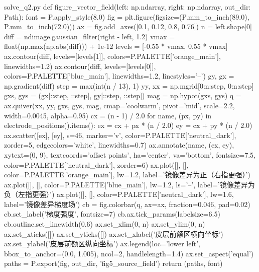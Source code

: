 \documentclass[bwprint]{gmcmthesis}
\begin{document}
\begin{appendices}
\begin{Python}{solve\_q2.py}
def figure_vector_field(left: np.ndarray, right: np.ndarray, out_dir: Path):
    font = P.apply_style(8.0)
    fig = plt.figure(figsize=(P.mm_to_inch(89.0), P.mm_to_inch(72.0)))
    ax = fig.add_axes([0.1, 0.12, 0.8, 0.76])
    n = left.shape[0]
    diff = ndimage.gaussian_filter(right - left, 1.2)
    vmax = float(np.max(np.abs(diff))) + 1e-12
    levels = [-0.55 * vmax, 0.55 * vmax]
    ax.contour(diff, levels=[levels[1]], colors=P.PALETTE['orange_main'], linewidths=1.2)
    ax.contour(diff, levels=[levels[0]], colors=P.PALETTE['blue_main'], linewidths=1.2, linestyles='--')
    gy, gx = np.gradient(diff)
    step = max(int(n / 13), 1)
    yy, xx = np.mgrid[0:n:step, 0:n:step]
    gxs, gys = (gx[::step, ::step], gy[::step, ::step])
    mag = np.hypot(gxs, gys)
    q = ax.quiver(xx, yy, gxs, gys, mag, cmap='coolwarm', pivot='mid', scale=2.2, width=0.0045, alpha=0.95)
    cx = (n - 1) / 2.0
    for name, (px, py) in electrode_positions().items():
        ex = cx + px * (n / 2.0)
        ey = cx + py * (n / 2.0)
        ax.scatter([ex], [ey], s=46, marker='v', color=P.PALETTE['neutral_dark'], zorder=5, edgecolors='white', linewidths=0.7)
        ax.annotate(name, (ex, ey), xytext=(0, 9), textcoords='offset points', ha='center', va='bottom', fontsize=7.5, color=P.PALETTE['neutral_dark'], zorder=6)
    ax.plot([], [], color=P.PALETTE['orange_main'], lw=1.2, label='镜像差异为正（右指更强）')
    ax.plot([], [], color=P.PALETTE['blue_main'], lw=1.2, ls='--', label='镜像差异为负（左指更强）')
    ax.plot([], [], color=P.PALETTE['neutral_dark'], lw=1.6, label='镜像差异梯度场')
    cb = fig.colorbar(q, ax=ax, fraction=0.046, pad=0.02)
    cb.set_label('梯度强度', fontsize=7)
    cb.ax.tick_params(labelsize=6.5)
    cb.outline.set_linewidth(0.6)
    ax.set_xlim(0, n)
    ax.set_ylim(0, n)
    ax.set_xticks([])
    ax.set_yticks([])
    ax.set_xlabel('皮层前额区横向坐标')
    ax.set_ylabel('皮层前额区纵向坐标')
    ax.legend(loc='lower left', bbox_to_anchor=(0.0, 1.005), ncol=2, handlelength=1.4)
    ax.set_aspect('equal')
    paths = P.export(fig, out_dir, 'fig5_source_field')
    return (paths, font)


\end{Python}
\end{appendices}
\end{document}

